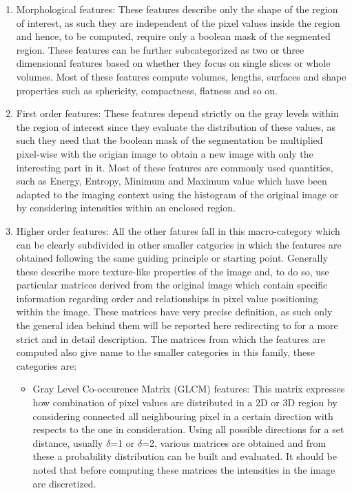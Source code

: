 \begin{enumerate}
\item Morphological features: These features describe only the shape of the region of interest, as such they are independent of the pixel values inside the region and hence, to be computed, require only a boolean mask of the segmented region. These features can be further subcategorized as two or three dimensional features based on whether they focus on single slices or whole volumes. Most of these features compute volumes, lengths, surfaces and shape properties such as sphericity, compactness, flatness and so on.
\item First order features: These features depend strictly on the gray levels within the region of interest since they evaluate the distribution of these values, as such they need that the boolean mask of the segmentation be multiplied pixel-wise with the origian image to obtain a new image with only the interesting part in it. Most of these features are commonly used quantities, such as Energy, Entropy, Minimum and Maximum value which have been adapted to the imaging context using the histogram of the original image or by considering intensities within an enclosed region.
\item Higher order features: All the other fatures fall in this macro-category which can be clearly subdivided in other smaller catgories in which the features are obtained following the same guiding principle or starting point. Generally these describe more texture-like properties of the image and, to do so, use particular matrices derived from the original image which contain specific information regarding order and relationships in pixel value positioning within the image. These matrices have very precise definition, as such only the general idea behind them will be reported here redirecting to \cite{IBSI} for a more strict and in detail description. The matrices from which the features are computed also give name to the smaller categories in this family, these categories are:
	\begin{itemize}
		\item Gray Level Co-occurence Matrix (GLCM) features: This matrix expresses how combination of pixel values are distributed in a 2D or 3D region by considering connected all neighbouring pixel in a certain direction with respects to the one in consideration. Using all possible directions for a set distance, usually $\delta$=1 or $\delta$=2, various matrices are obtained and from these a probability distribution can be built and evaluated. It should be noted that before computing these matrices the intensities in the image are discretized.

\end{itemize}
\end{enumerate}
